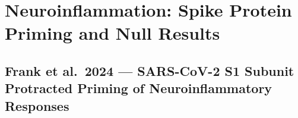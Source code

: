 
\section{Neuroinflammation: Spike Protein Priming and Null Results}
\label{sec:bib-neuroinflammation-spike-2026}

\subsection{Frank et al.\ 2024 --- SARS-CoV-2 S1 Subunit Protracted Priming of Neuroinflammatory Responses}

